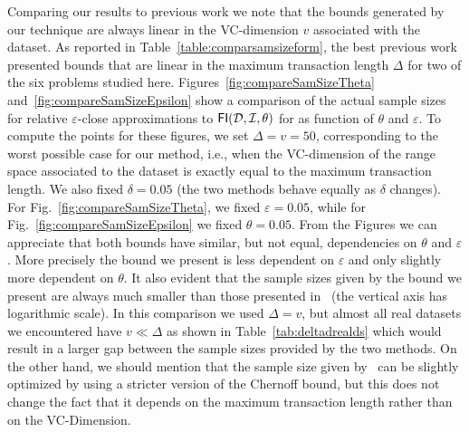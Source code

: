 Comparing our results to previous work we note that the bounds generated by our
technique are always linear in the VC-dimension $v$ associated with the dataset.
As reported in Table~\ref{table:comparsamsizeform}, the best previous
work~\citep{ChakaravarthyPS09} presented bounds that are linear in the maximum
transaction length $\Delta$ for two of the six problems studied here.
Figures~\ref{fig:compareSamSizeTheta} and~\ref{fig:compareSamSizeEpsilon} show
a comparison of the actual sample sizes for relative $\varepsilon$-close
approximations to $\mathsf{FI}({\cal D},{\cal I},\theta)$ for as function of $\theta$ and
$\varepsilon$. To compute the points for these figures, we set $\Delta=v=50$,
corresponding to the worst possible case for our method, i.e., when the
VC-dimension of the range space associated to the dataset is exactly equal to
the maximum transaction length. We also fixed $\delta=0.05$ (the two methods
behave equally as $\delta$ changes). For Fig.~\ref{fig:compareSamSizeTheta}, we
fixed $\varepsilon=0.05$, while for Fig.~\ref{fig:compareSamSizeEpsilon} we
fixed $\theta=0.05$. From the Figures we can appreciate that both bounds have
similar, but not equal, dependencies on $\theta$ and $\varepsilon$. More
precisely the bound we present is less dependent on $\varepsilon$
and only slightly more dependent on $\theta$. It also evident that the sample
sizes given by the bound we present are always much smaller than
those presented in~\citep{ChakaravarthyPS09} (the vertical axis has logarithmic
scale). In this comparison we used $\Delta=v$, but almost all real datasets
we encountered have $v\ll\Delta$ as shown in Table~\ref{tab:deltadrealds} which
would result in a larger gap between the sample sizes provided by the two
methods. On the other hand, we should mention that the sample size given
by~\citep{ChakaravarthyPS09} can be slightly optimized by using a stricter
version of the Chernoff bound, but this does not change the fact that it
depends on the maximum transaction length rather than on the VC-Dimension.

